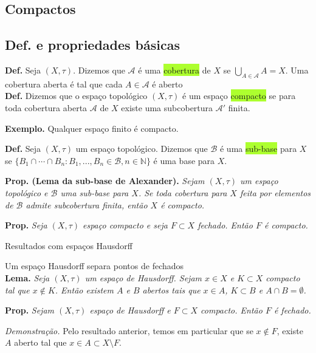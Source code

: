\documentclass{article}
\begin{document}
\begin{landscape}
\begin{center}
\section{Compactos}
    
\end{center}
\begin{multicols}{3}
\subsection{Def. e propriedades básicas}
\textbf{Def.} Seja $(X, \tau)$. Dizemos que $\mathcal{A}$ é uma \colorbox{GreenYellow}{cobertura} de $X$ se $\bigcup_{A \in \mathcal{A}} A = X$. Uma cobertura aberta é tal que cada $A \in \mathcal{A}$ é aberto\\

\textbf{Def.} Dizemos que o espaço topológico $(X, \tau)$ é um espaço \colorbox{GreenYellow}{compacto} se para toda cobertura aberta $\mathcal{A}$ de $X$ existe uma subcobertura $\mathcal{A}'$  finita.\medskip

\textbf{Exemplo.} Qualquer espaço finito é compacto.\medskip

\textbf{Def.} Seja $(X, \tau)$ um espaço topológico. Dizemos que $\mathcal{B}$ é uma \colorbox{GreenYellow}{sub-base} para $X$ se $\{B_1 \cap \cdots \cap B_n : B_1, ..., B_n \in \mathcal{B}, n \in \mathbb{N}\}$ é uma base para $X$.\medskip

\textbf{Prop. (Lema da sub-base de Alexander).} \textit{Sejam $(X, \tau)$ um espaço topológico e $\mathcal{B}$ uma sub-base para $X$. Se toda cobertura para $X$ feita por elementos de $\mathcal{B}$ admite subcobertura finita, então $X$ é compacto.}\medskip

\textbf{Prop.} \textit{Seja $(X, \tau)$ espaço compacto e seja $F \subset X$ fechado. Então $F$ é compacto.}\medskip

\colorbox{cinza}{Resultados com espaços Hausdorff}\medskip

\color{Emerald}Um espaço Hausdorff separa pontos de fechados\\
\color{black}
\textbf{Lema. } \textit{Seja \((X, \tau)\) um espaço de Hausdorff. Sejam \(x \in X\) e \(K \subset X\) compacto tal que \(x \notin K\). Então existem \(A\) e \(B\) abertos tais que \(x \in A\), \(K \subset B\) e \(A \cap B = \emptyset\).}\medskip

\textbf{Prop. } \textit{Sejam \((X, \tau)\) espaço de Hausdorff e \(F \subset X\) compacto. Então \(F\) é fechado.}\medskip

\textit{Demonstração.} Pelo resultado anterior, temos em particular que se \(x \notin F\), existe \(A\) aberto tal que \(x \in A \subset X \setminus F\).  \medskip


\end{multicols}
\end{landscape}
\end{document}

